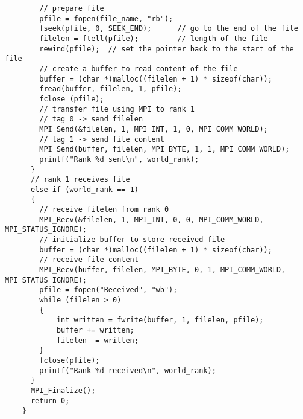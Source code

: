 \documentclass[12pt]{article}
\begin{document}
\begin{verbatim}
        // prepare file
        pfile = fopen(file_name, "rb");
        fseek(pfile, 0, SEEK_END);      // go to the end of the file
        filelen = ftell(pfile);         // length of the file
        rewind(pfile);  // set the pointer back to the start of the file 
        // create a buffer to read content of the file
        buffer = (char *)malloc((filelen + 1) * sizeof(char)); 
        fread(buffer, filelen, 1, pfile);
        fclose (pfile); 
        // transfer file using MPI to rank 1
        // tag 0 -> send filelen 
        MPI_Send(&filelen, 1, MPI_INT, 1, 0, MPI_COMM_WORLD);
        // tag 1 -> send file content
        MPI_Send(buffer, filelen, MPI_BYTE, 1, 1, MPI_COMM_WORLD);
        printf("Rank %d sent\n", world_rank);
      }
      // rank 1 receives file 
      else if (world_rank == 1)
      {
        // receive filelen from rank 0
        MPI_Recv(&filelen, 1, MPI_INT, 0, 0, MPI_COMM_WORLD, MPI_STATUS_IGNORE);
        // initialize buffer to store received file 
        buffer = (char *)malloc((filelen + 1) * sizeof(char));
        // receive file content
        MPI_Recv(buffer, filelen, MPI_BYTE, 0, 1, MPI_COMM_WORLD, MPI_STATUS_IGNORE);
        pfile = fopen("Received", "wb");
        while (filelen > 0)
        {
            int written = fwrite(buffer, 1, filelen, pfile);
            buffer += written;
            filelen -= written;
        }
        fclose(pfile);
        printf("Rank %d received\n", world_rank);
      }
      MPI_Finalize();
      return 0;
    }
    \end{verbatim}
  
\end{document}
